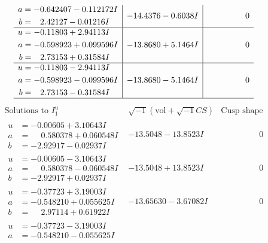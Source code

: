 \documentclass[1p]{elsarticle_modified}
\theoremstyle{definition}
\newcommand{\I}{\sqrt{-1}}
\begin{document}
$$\begin{array}{c|c|c}
\begin{aligned}
a &= -0.642407 - 0.112172 I \\
b &= \phantom{-}2.42127 - 0.01216 I\end{aligned}
 & -14.4376 - 0.6038 I & \phantom{-0.000000 } 0 \\ \hline\begin{aligned}
u &= -0.11803 + 2.94113 I \\
a &= -0.598923 + 0.099596 I \\
b &= \phantom{-}2.73153 + 0.31584 I\end{aligned}
 & -13.8680 + 5.1464 I & \phantom{-0.000000 } 0 \\ \hline\begin{aligned}
u &= -0.11803 - 2.94113 I \\
a &= -0.598923 - 0.099596 I \\
b &= \phantom{-}2.73153 - 0.31584 I\end{aligned}
 & -13.8680 - 5.1464 I & \phantom{-0.000000 } 0\\
 \hline 
 \end{array}$$\newpage$$\begin{array}{c|c|c}  
\text{Solutions to }I^u_{1}& \I (\text{vol} + \sqrt{-1}CS) & \text{Cusp shape}\\
 \hline 
\begin{aligned}
u &= -0.00605 + 3.10643 I \\
a &= \phantom{-}0.580378 + 0.060548 I \\
b &= -2.92917 - 0.02937 I\end{aligned}
 & -13.5048 - 13.8523 I & \phantom{-0.000000 } 0 \\ \hline\begin{aligned}
u &= -0.00605 - 3.10643 I \\
a &= \phantom{-}0.580378 - 0.060548 I \\
b &= -2.92917 + 0.02937 I\end{aligned}
 & -13.5048 + 13.8523 I & \phantom{-0.000000 } 0 \\ \hline\begin{aligned}
u &= -0.37723 + 3.19003 I \\
a &= -0.548210 + 0.055625 I \\
b &= \phantom{-}2.97114 + 0.61922 I\end{aligned}
 & -13.65630 - 3.67082 I & \phantom{-0.000000 } 0 \\ \hline\begin{aligned}
u &= -0.37723 - 3.19003 I \\
a &= -0.548210 - 0.055625 I \\

\end{aligned}
\end{array}$$
\end{document}
